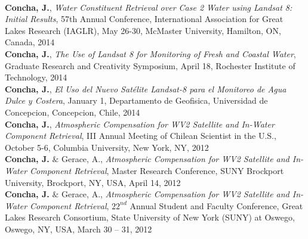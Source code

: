 \documentclass[11pt]{res} %
\begin{document}
\begin{resume}
\vspace{0.1in}\\
{\bf Concha, J.}, {\it Water Constituent Retrieval over Case 2 Water using Landsat 8: Initial Results}, 57th Annual Conference, International Association for Great Lakes Research (IAGLR), May 26-30, McMaster University, Hamilton, ON, Canada, 2014
\vspace{0.1in}\\
{\bf Concha, J.}, {\it The Use of Landsat 8 for Monitoring of Fresh and Coastal Water}, Graduate Research and Creativity Symposium, April 18, Rochester Institute of Technology, 2014
\vspace{0.1in}\\
{\bf Concha, J.}, {\it El Uso del Nuevo Satélite Landsat-8 para el Monitoreo de Agua Dulce y Costera}, January 1, Departamento de Geofisica, Universidad de Concepcion, Concepcion, Chile, 2014
\vspace{0.1in}\\
{\bf Concha, J.}, {\it Atmospheric Compensation for WV2 Satellite and In-Water Component Retrieval}, III Annual Meeting of Chilean Scientist in the U.S., October 5-6, Columbia University, New York, NY, 2012
\vspace{0.1in}\\
{\bf Concha, J.} $\&$ Gerace, A., {\it Atmospheric Compensation for WV2 Satellite and In-Water Component Retrieval}, Master Research Conference, SUNY Brockport University, Brockport, NY, USA, April 14, 2012
\vspace{0.1in}\\
{\bf Concha, J.} $\&$ Gerace, A., {\it Atmospheric Compensation for WV2 Satellite and In-Water Component Retrieval}, $22^{nd}$ Annual Student and Faculty Conference, Great Lakes Research Consortium, State University of New York (SUNY) at Oswego, Oswego, NY, USA, March 30 -- 31, 2012\\

\vspace{-0.2in}

\end{resume}
\end{document}
